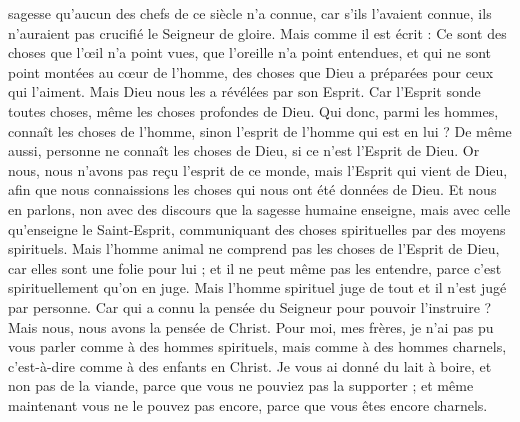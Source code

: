 \begin{multicols}{2}
sagesse qu’aucun des chefs de ce siècle n'a connue, car s'ils l’avaient connue, ils n’auraient pas crucifié le Seigneur de gloire.
Mais comme il est écrit : Ce sont des choses que l’œil n'a point vues, que l'oreille n'a point entendues, et qui ne sont point montées au cœur de l'homme, des choses que Dieu a préparées pour ceux qui l’aiment.
Mais Dieu nous les a révélées par son Esprit. Car l'Esprit sonde toutes choses, même les choses profondes de Dieu.
Qui donc, parmi les hommes, connaît les choses de l'homme, sinon l’esprit de l'homme qui est en lui ? De même aussi, personne ne connaît les choses de Dieu, si ce n’est l'Esprit de Dieu.
Or nous, nous n’avons pas reçu l'esprit de ce monde, mais l'Esprit qui vient de Dieu, afin que nous connaissions les choses qui nous ont été données de Dieu.
Et nous en parlons, non avec des discours que la sagesse humaine enseigne, mais avec celle qu'enseigne le Saint-Esprit, communiquant des choses spirituelles par des moyens spirituels.
Mais l'homme animal ne comprend pas les choses de l'Esprit de Dieu, car elles sont une folie pour lui ; et il ne peut même pas les entendre, parce c’est spirituellement qu’on en juge.
Mais l'homme spirituel juge de tout et il n'est jugé par personne.
Car qui a connu la pensée du Seigneur pour pouvoir l’instruire ? Mais nous, nous avons la pensée de Christ.
\VerseOne{}Pour moi, mes frères, je n'ai pas pu vous parler comme à des hommes spirituels, mais comme à des hommes charnels, c'est-à-dire comme à des enfants en Christ.
Je vous ai donné du lait à boire, et non pas de la viande, parce que vous ne pouviez pas la supporter ; et même maintenant vous ne le pouvez pas encore, parce que vous êtes encore charnels.

\end{multicols}
